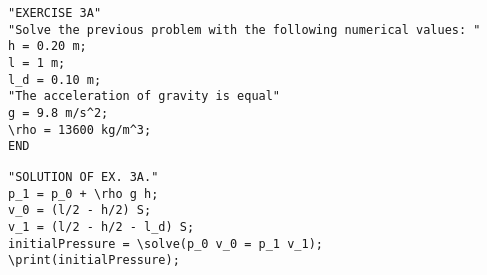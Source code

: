 \vspace*{-3mm}

\begin{verbatim}
"EXERCISE 3A"
"Solve the previous problem with the following numerical values: "
h = 0.20 m;
l = 1 m;
l_d = 0.10 m;
"The acceleration of gravity is equal"
g = 9.8 m/s^2;
\rho = 13600 kg/m^3;
END
\end{verbatim}

\vspace*{-3mm}

\begin{verbatim}
"SOLUTION OF EX. 3A."
p_1 = p_0 + \rho g h;
v_0 = (l/2 - h/2) S; 
v_1 = (l/2 - h/2 - l_d) S;
initialPressure = \solve(p_0 v_0 = p_1 v_1);
\print(initialPressure);
\end{verbatim}
